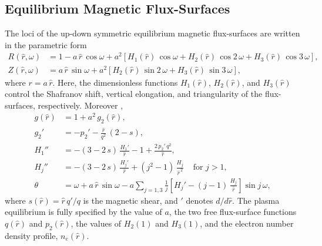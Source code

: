 \documentclass{iopjournal}
\begin{document}
\subsection{Equilibrium Magnetic Flux-Surfaces}
The loci of the up-down symmetric equilibrium magnetic flux-surfaces are written in the parametric form \cite{tear5}
\begin{align}
R(\hat{r},\omega) &= 1 -a\,\hat{r}\,\cos\omega + a^{2}\left[H_1(\hat{r})\,\cos \omega + H_2(\hat{r})\,\cos 2\,\omega+H_3(\hat{r})\,\cos 3\,\omega\right], \label{e19x}\\[0.5ex]
Z(\hat{r},\omega)&= a\,\hat{r}\,\sin\omega +a^{2}\left[H_2(\hat{r})\,\sin 2\,\omega+H_3(\hat{r})\,\sin 3\,\omega\right], \label{e20x}
\end{align}
where  $r=a\,\hat{r}$. 
Here, the dimensionless functions $H_1(\hat{r})$, $H_2(\hat{r})$, and $H_3(\hat{r})$ control the Shafranov shift, vertical elongation, and  triangularity of
the flux-surfaces, respectively. 
Moreover \cite{exp}, 
\begin{align}
g(\hat{r}) &= 1+ a^2\,g_2(\hat{r}),\\[0.5ex]
g_2'&= -p_2' - \frac{\hat{r}}{q^2}\,(2-s),\\[0.5ex]
H_1''&= -(3-2\,s)\,\frac{H_1' }{\hat{r}}-1+\frac{2\,p_2'\,q^2}{\hat{r}},\label{e27}\\[0.5ex]
H_j''&= -(3-2\,s)\,\frac{H_j'}{\hat{r}}+(j^2-1)\,\frac{H_j}{\hat{r}^{\,2}}~~~~~\mbox{for $j>1$},\label{e33x}\\[0.5ex]
\theta &= \omega+a\,\hat{r}\,\sin\omega - a\sum_{j=1,3}\frac{1}{j}\left[H_j'-(j-1)\,\frac{H_j}{\hat{r}}\right]\sin j\,\omega,
\end{align}
where $s(\hat{r}) = \hat{r}\,q'/q$ is the magnetic shear, and $'$ denotes $d/d\hat{r}$. The plasma equilibrium is fully specified by the value of $a$, the two free
flux-surface functions $q(\hat{r})$ and $p_2(\hat{r})$, the values of $H_2(1)$ and $H_3(1)$, and the electron number density profile, $n_e(\hat{r})$. 
\end{document}
